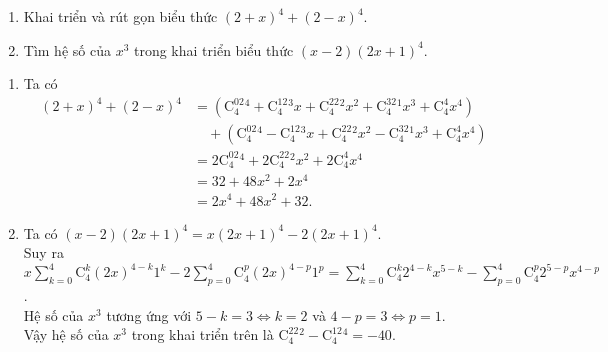 \begin{bt}%
\begin{enumerate}
\item Khai triển và rút gọn biểu thức $(2+x)^4+(2-x)^4$.
\item Tìm hệ số của $x^3$ trong khai triển biểu thức $(x-2)(2x+1)^4$.
\end{enumerate}
\loigiai
{
\begin{enumerate}
\item Ta có
\begin{align*}
(2+x)^4+(2-x)^4
&=\left(\mathrm{C}_4^02^4+\mathrm{C}_4^12^3x+\mathrm{C}_4^22^2x^2+\mathrm{C}_4^32^1x^3+\mathrm{C}_4^4x^4\right) \\
&\quad+\left(\mathrm{C}_4^02^4-\mathrm{C}_4^12^3x+\mathrm{C}_4^22^2x^2-\mathrm{C}_4^32^1x^3+\mathrm{C}_4^4x^4\right) \\
&=2\mathrm{C}_4^02^4+2\mathrm{C}_4^22^2x^2+2\mathrm{C}_4^4x^4 \\
&=32+48x^2+2x^4 \\
&=2x^4+48x^2+32.
\end{align*}
\item Ta có $(x-2)(2x+1)^4=x(2x+1)^4-2(2x+1)^4$.\\
Suy ra $x \displaystyle\sum\limits_{k=0}^{4}\mathrm{C}_4^k(2x)^{4-k}1^k-2\displaystyle\sum\limits_{p=0}^{4}\mathrm{C}_4^p(2x)^{4-p}1^p= \displaystyle\sum\limits_{k=0}^{4}\mathrm{C}_4^k2^{4-k}x^{5-k}-\displaystyle\sum\limits_{p=0}^{4}\mathrm{C}_4^p2^{5-p}x^{4-p}$.\\ Hệ số của $x^3$ tương ứng với $5-k=3\Leftrightarrow k =2$ và $4-p=3 \Leftrightarrow p=1$.\\
Vậy hệ số của $x^3$ trong khai triển trên là $\mathrm{C}_4^22^2-\mathrm{C}_4^12^4=-40.$
\end{enumerate}
}
\end{bt}

